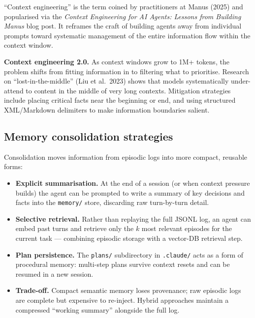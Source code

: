 \begin{notebox}
  ``Context engineering'' is the term coined by practitioners at Manus (2025) and
  popularised via the \emph{Context Engineering for AI Agents: Lessons from Building
  Manus} blog post. It reframes the craft of building agents away from individual
  prompts toward systematic management of the entire information flow within the
  context window.
\end{notebox}

\textbf{Context engineering 2.0.} As context windows grow to 1M+ tokens, the problem
shifts from fitting information in to filtering what to prioritise. Research on
``lost-in-the-middle'' (Liu et al.\ 2023) shows that models systematically under-attend
to content in the middle of very long contexts. Mitigation strategies include placing
critical facts near the beginning or end, and using structured XML/Markdown delimiters
to make information boundaries salient.

\subsection{Memory consolidation strategies}

Consolidation moves information from episodic logs into more compact, reusable forms:

\begin{itemize}
  \item \textbf{Explicit summarisation.} At the end of a session (or when context
    pressure builds) the agent can be prompted to write a summary of key decisions and
    facts into the \texttt{memory/} store, discarding raw turn-by-turn detail.

  \item \textbf{Selective retrieval.} Rather than replaying the full JSONL log, an agent
    can embed past turns and retrieve only the $k$ most relevant episodes for the current
    task --- combining episodic storage with a vector-DB retrieval step.

  \item \textbf{Plan persistence.} The \texttt{plans/} subdirectory in
    \texttt{.claude/} acts as a form of procedural memory: multi-step plans survive
    context resets and can be resumed in a new session.

  \item \textbf{Trade-off.} Compact semantic memory loses provenance; raw episodic logs
    are complete but expensive to re-inject. Hybrid approaches maintain a compressed
    ``working summary'' alongside the full log.
\end{itemize}

